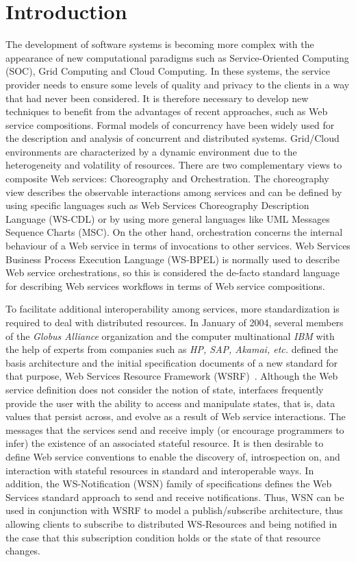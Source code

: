 \section{Introduction}

The development of software systems is becoming more complex with the 
appearance
of new computational paradigms such as Service-Oriented  Computing  (SOC), 
Grid Computing and Cloud Computing.
In these systems, the service provider needs to ensure some levels of 
quality and privacy to the clients in a way that had never been considered. It is therefore necessary to develop new techniques to benefit from the advantages 
of recent approaches, such as Web service compositions. Formal models of concurrency have been widely used for the description and analysis of concurrent and distributed systems. 
Grid/Cloud environments are characterized by a dynamic environment due to the heterogeneity and volatility of resources. There are two complementary views to composite Web services: Choreography and Orchestration. The choreography view describes the observable interactions among services and can
be  defined  by  using  specific  languages such as Web  Services
Choreography  Description  Language  (WS-CDL) %
or  by
using more general languages like UML Messages Sequence
Charts (MSC). On the other hand, orchestration concerns
the internal behaviour of a Web service in terms of invocations
to  other  services.  Web Services Business Process Execution Language (WS-BPEL) \cite{BPEL4WS} is normally used 
to describe Web service orchestrations, so this
is considered the de-facto standard language for describing Web services
workflows in terms of Web service compositions.

To facilitate additional interoperability among services, more standardization is required to deal with distributed resources. In January of 2004, several members of the \emph{Globus Alliance} organization and the computer multinational \emph{IBM} with the help of experts from companies such as \emph{HP, SAP, Akamai, etc.} defined the basis architecture and the initial specification documents of a new standard for that purpose, Web Services Resource Framework (WSRF)~\cite{Banks2006,Czajkowski2004,Foster2004}. Although the Web service 
definition does not consider the notion of state, interfaces frequently provide the user with the ability to access and manipulate
states, that is, data values that persist across, and evolve as a result of Web service interactions. The messages that the services 
send and receive imply (or encourage programmers to infer) the existence of an associated stateful resource. It is then desirable 
to define Web service conventions to enable the discovery of, introspection on, and interaction with stateful resources in standard 
and interoperable ways. In addition, the WS-Notification (WSN) family of specifications defines the Web Services standard approach to send and receive
notifications. Thus, WSN can be used in conjunction with WSRF to model a publish/subscribe architecture, thus allowing clients to subscribe to distributed WS-Resources and being notified in the case that this subscription condition holds or the state of that resource changes.

